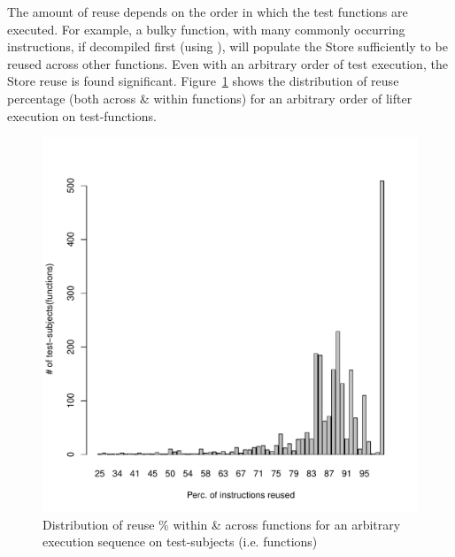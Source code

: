The amount of reuse depends on the order in which the test functions are
executed.  For example, a bulky function, with many commonly occurring
instructions, if decompiled first (using \compd), will populate  the Store
sufficiently to be reused across other functions.  Even with an
arbitrary order of test execution, the Store reuse is found significant.
Figure~\ref{fig:reuse} shows the distribution of reuse percentage (both across
    \& within functions) for an arbitrary order of lifter execution on \plvT
test-functions.

\begin{figure}
    \includegraphics[scale=0.5]{scalable-validation/figs/reuse.png}
    \caption{Distribution of reuse \% within \& across functions
        for an arbitrary execution sequence \compd 
        on test-subjects (i.e. functions)} \label{fig:reuse}
\end{figure}


